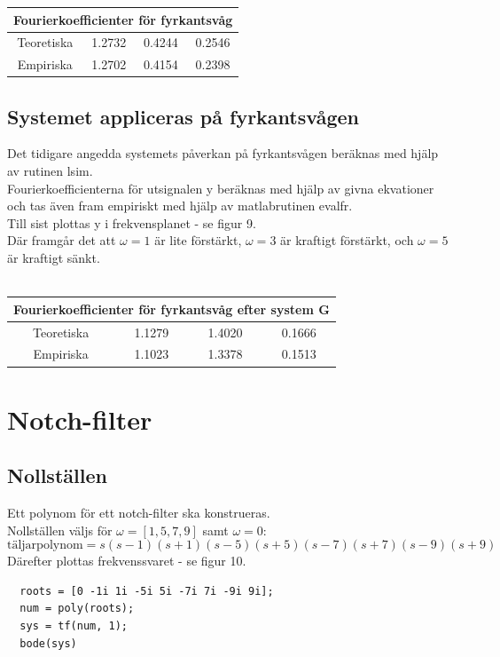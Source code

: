 \documentclass[]{article}
\begin{document}
\begin{tabular}{|c||ccc|}
  \hline
  \multicolumn{4}{|c|}{Fourierkoefficienter för fyrkantsvåg} \\
  \hline
  Teoretiska & 1.2732 & 0.4244 & 0.2546\\
  \hline
  Empiriska & 1.2702 & 0.4154 & 0.2398\\
  \hline
\end{tabular}
\subsection{Systemet appliceras på fyrkantsvågen} %
\label{sub:systemet_appliceras_pa_fyrkantsvagen}
Det tidigare angedda systemets påverkan på fyrkantsvågen beräknas med hjälp av rutinen lsim.\\
Fourierkoefficienterna för utsignalen y beräknas med hjälp av givna ekvationer och tas även fram empiriskt med hjälp av matlabrutinen evalfr. \\
Till sist plottas y i frekvensplanet - se figur 9.\\
Där framgår det att $\omega = 1$ är lite förstärkt, $\omega = 3$ är kraftigt förstärkt, och $\omega = 5$ är kraftigt sänkt. \\ \\
\begin{tabular}{|c||ccc|}
  \hline
  \multicolumn{4}{|c|}{Fourierkoefficienter för fyrkantsvåg efter system G} \\
  \hline
  Teoretiska & 1.1279 & 1.4020 & 0.1666\\
  \hline
  Empiriska & 1.1023 & 1.3378 & 0.1513\\
  \hline
\end{tabular}
\section{Notch-filter}
\subsection{Nollställen} %
\label{sub:konstruktion_av_taljar_och_namnarpolynom}
Ett polynom för ett notch-filter ska konstrueras. \\
Nollställen väljs för $\omega = [1,5,7,9]$ samt $\omega = 0$: \\
\[
  \text{täljarpolynom} = s(s - 1)(s + 1)(s - 5)(s + 5)(s - 7)(s + 7)(s - 9)(s + 9)
\]
Därefter plottas frekvenssvaret - se figur 10.
\begin{verbatim}
  roots = [0 -1i 1i -5i 5i -7i 7i -9i 9i];
  num = poly(roots);
  sys = tf(num, 1);
  bode(sys)
\end{verbatim}
\end{document}

